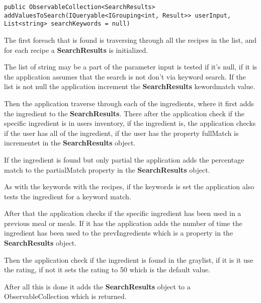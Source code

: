 \begin{lstlisting}[caption=addValuesToSearch, label={lst:addValuesToSearch}, language=CSharp]
        public ObservableCollection<SearchResults> addValuesToSearch(IQueryable<IGrouping<int, Result>> userInput, List<string> searchKeywords = null)
\end{lstlisting}

The first foreach that is found is traversing through all the recipes in the list, and for each recipe a \textbf{SearchResults} is initialized.

The list of string may be a part of the parameter input is tested if it's null, if it is the application assumes that the search is not don’t via keyword search. If the list is not null the application increment the \textbf{SearchResults} kewordmatch value.

Then the application traverse through each of the ingredients, where it first adds the ingredient to the \textbf{SearchResults}. There after the application check if the specific ingredient is in users inventory, if the ingredient is, the application checks if the user has all of the ingredient, if the user has the property fullMatch is incrementet in the \textbf{SearchResults} object.

If the ingredient is found but only partial the application adds the percentage match to the partialMatch property in the \textbf{SearchResults} object.

As with the keywords with the recipes, if the keywords is set the application also tests the ingredient for a keyword match.

After that the application checks if the specific ingredient has been used in a previous meal or meals.
If it has the application adds the number of time the ingredient has been used to the prevIngredients which is a property in the \textbf{SearchResults} object.

Then the application check if the ingredient is found in the graylist, if it is it use the rating, if not it sets the rating to 50 which is the default value.

After all this is done it adds the \textbf{SearchResults} object to a ObservableCollection which is returned.